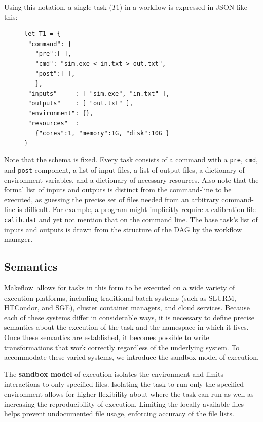 \documentclass[conference]{IEEEtran}
\newcommand{\mf}{Makeflow\ }
\begin{document}
Using this notation, a single task ($T1$) in a workflow
is expressed in JSON like this:

\begin{figure}[H]
\begin{framed}
\small
\begin{verbatim}
let T1 = {
 "command": {
   "pre":[ ],
   "cmd": "sim.exe < in.txt > out.txt",
   "post":[ ], 
   },
 "inputs"     : [ "sim.exe", "in.txt" ],
 "outputs"    : [ "out.txt" ],
 "environment": {},
 "resources"  :
   {"cores":1, "memory":1G, "disk":10G }
}
\end{verbatim}
\end{framed}
\label{basic-task}
\end{figure}

Note that the schema is fixed.
Every task consists of a command with a \verb$pre$, \verb$cmd$, and \verb$post$ component, a list of input files, a list of output files,
a dictionary of environment variables, 
and a dictionary of necessary resources.  
Also note that the formal list of
inputs and outputs is distinct from the command-line to be executed,
as guessing the precise set of files needed from 
an arbitrary command-line is difficult.  For example,
a program might implicitly require a calibration file {\tt calib.dat}
and yet not mention that on the command line.  
The base task's list of inputs
and outputs is drawn from the structure of the DAG by the workflow
manager.



\subsection{Semantics}
\label{sec:sandboxing}

\mf allows for tasks in this form to be executed on a wide
variety of execution platforms, including traditional batch
systems (such as 
SLURM\cite{Jette02slurm:simple}, 
HTCondor\cite{condor-hunter}, 
and SGE\cite{Microsystems:2001:SGE:560889.792378}), 
cluster container managers, and cloud services.
Because each of these systems differ in considerable ways,
it is necessary to define precise semantics about the
execution of the task and the namespace in which it lives.
Once these semantics are established, it becomes possible
to write transformations that work correctly regardless of the underlying system.
To accommodate these varied systems, we introduce the
sandbox model of execution.

The {\bf sandbox model} of execution isolates the environment 
and limits interactions to only specified files.
Isolating the task to run only the specified environment allows for higher
flexibility about where the task can run as well as increasing the reproducibility
of execution. Limiting the locally available files helps
prevent undocumented file usage, enforcing accuracy of the
file lists.
\end{document}
